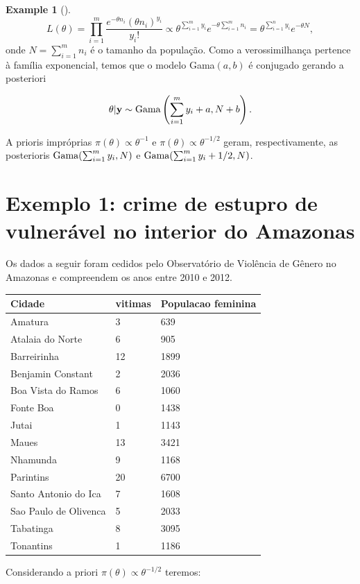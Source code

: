 \documentclass[
  letterpaper,
  DIV=11,
  numbers=noendperiod]{scrreprt}
\theoremstyle{definition}
\theoremstyle{plain}
\theoremstyle{definition}
\newtheorem{example}{Example}[chapter]
\theoremstyle{remark}
\begin{document}
\begin{example}[]
\[L(\theta)=\prod_{i=1}^m\frac{e^{-\theta n_i}(\theta n_i)^{y_i}}{y_i!}\varpropto \theta^{\sum_{i=1}^m y_i}e^{-\theta \sum_{i=1}^m n_i}=\theta^{\sum_{i=1}^n y_i}e^{-\theta N},\]
onde \(N=\sum_{i=1}^m n_i\) é o tamanho da população. Como a
verossimilhança pertence à família exponencial, temos que o modelo
Gama\((a,b)\) é conjugado gerando a posteriori

\[\theta|\mathbf{y}\sim\hbox{Gama}\left(\sum_{i=1}^{m}y_i+a,N+b\right).\]

A prioris impróprias \(\pi(\theta)\varpropto \theta^{-1}\) e
\(\pi(\theta)\varpropto \theta^{-1/2}\) geram, respectivamente, as
posterioris \(\hbox{Gama}(\sum_{i=1}^m y_i,N)\) e
\(\hbox{Gama}(\sum_{i=1}^m y_i+1/2,N)\).

\section{Exemplo 1: crime de estupro de vulnerável no interior do
Amazonas}\label{exemplo-1-crime-de-estupro-de-vulneruxe1vel-no-interior-do-amazonas}

Os dados a seguir foram cedidos pelo Observatório de Violência de Gênero
no Amazonas e compreendem os anos entre 2010 e 2012.

\begin{longtable}[]{@{}lll@{}}
\toprule\noalign{}
Cidade & vitimas & Populacao feminina \\
\midrule\noalign{}
\endhead
\bottomrule\noalign{}
\endlastfoot
Amatura & 3 & 639 \\
Atalaia do Norte & 6 & 905 \\
Barreirinha & 12 & 1899 \\
Benjamin Constant & 2 & 2036 \\
Boa Vista do Ramos & 6 & 1060 \\
Fonte Boa & 0 & 1438 \\
Jutai & 1 & 1143 \\
Maues & 13 & 3421 \\
Nhamunda & 9 & 1168 \\
Parintins & 20 & 6700 \\
Santo Antonio do Ica & 7 & 1608 \\
Sao Paulo de Olivenca & 5 & 2033 \\
Tabatinga & 8 & 3095 \\
Tonantins & 1 & 1186 \\
\end{longtable}

Considerando a priori \(\pi(\theta)\varpropto \theta^{-1/2}\) teremos:


\end{example}
\end{document}
